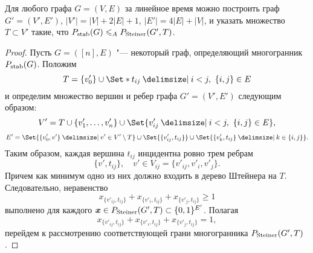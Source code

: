 \begin{theorem}
	Для любого графа $G=(V,E)$ за линейное время можно построить граф $G'=(V',E')$, $|V'|=|V|+2|E|+1$, $|E'|=4|E|+|V|$, и указать множество $T\subset V'$ такие, что
	$P_{\textup{stab}}(G) \leqslant_A P_{\textup{Steiner}}(G',T)$.
\end{theorem}
\begin{proof}
	Пусть $G=([n],E)$ "--- некоторый граф, определяющий многогранник $P_{\textup{stab}}(G)$.
	Положим 
	\[
	T = \{v'_0\} \cup \Set*{t_{ij} \given i < j, \ \{i,j\}\in E}
	\]
	и определим множество вершин и ребер графа $G'=(V',E')$ следующим образом:
	\[
	V' = T \cup \{v'_1,\dots,v'_n\} \cup \Set{v'_{ij} \given i < j, \ \{i,j\}\in E},
	\]
	\[
	E' = \Set{\{v'_0, v'\} \given v'\in V'\setminus T} 
	\cup \Set{\{v'_{ij}, t_{ij}\}}
	\cup \Set{\{v'_{k}, t_{ij}\} \given k\in \{i,j\}}.
	\]
	Таким образом, каждая вершина $t_{ij}$ инцидентна ровно трем ребрам 
	\[
	\{v', t_{ij}\}, \quad v' \in V_{ij} = \{v'_{ij}, v'_i, v'_j\}.
	\]
	Причем как минимум одно из них должно входить в дерево Штейнера на $T$.
	Следовательно, неравенство
	\[
	x_{\{v'_{ij}, t_{ij}\}} + x_{\{v'_{i}, t_{ij}\}} + x_{\{v'_{j}, t_{ij}\}} \ge 1
	\]
	выполнено для каждого $\bm{x} \in P_{\textup{Steiner}}(G',T) \subset \{0,1\}^{E'}$.
	Полагая 
	\begin{equation}
	\label{eq:proofSteiner1}
	x_{\{v'_{ij}, t_{ij}\}} + x_{\{v'_{i}, t_{ij}\}} + x_{\{v'_{j}, t_{ij}\}} = 1,
	\end{equation}
	перейдем к рассмотрению соответствующей грани многогранника $P_{\textup{Steiner}}(G',T)$.
	

\end{proof}
